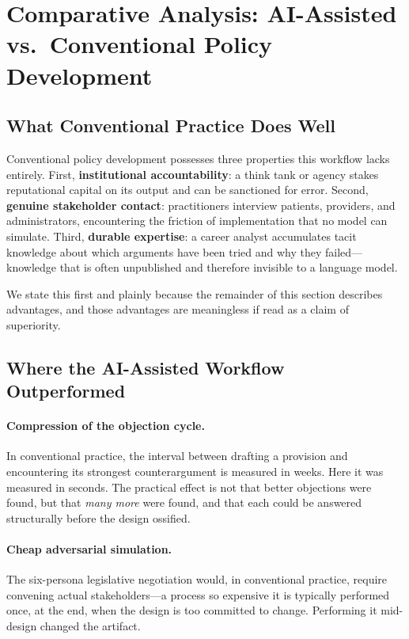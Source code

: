 \documentclass[11pt,a4paper]{article}
\begin{document}
\section{Comparative Analysis: AI-Assisted vs.\ Conventional Policy Development}
\label{sec:comparative}

\subsection{What Conventional Practice Does Well}

Conventional policy development possesses three properties this workflow lacks entirely. First, \textbf{institutional accountability}: a think tank or agency stakes reputational capital on its output and can be sanctioned for error. Second, \textbf{genuine stakeholder contact}: practitioners interview patients, providers, and administrators, encountering the friction of implementation that no model can simulate. Third, \textbf{durable expertise}: a career analyst accumulates tacit knowledge about which arguments have been tried and why they failed---knowledge that is often unpublished and therefore invisible to a language model.

We state this first and plainly because the remainder of this section describes advantages, and those advantages are meaningless if read as a claim of superiority.

\subsection{Where the AI-Assisted Workflow Outperformed}

\paragraph{Compression of the objection cycle.} In conventional practice, the interval between drafting a provision and encountering its strongest counterargument is measured in weeks. Here it was measured in seconds. The practical effect is not that better objections were found, but that \emph{many more} were found, and that each could be answered structurally before the design ossified.

\paragraph{Cheap adversarial simulation.} The six-persona legislative negotiation would, in conventional practice, require convening actual stakeholders---a process so expensive it is typically performed once, at the end, when the design is too committed to change. Performing it mid-design changed the artifact.
\end{document}

